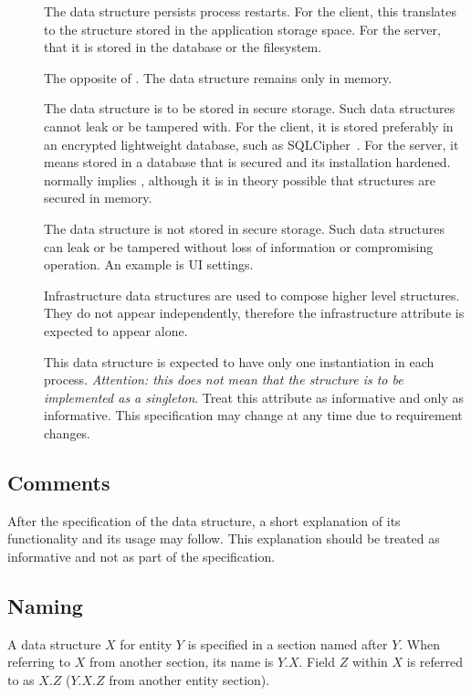 \documentclass[a4paper,10pt]{article}
\begin{document}
\begin{description}
 \item[\persistent] The data structure persists process restarts. For the client, this translates to the structure stored in the application storage space. For the server, that it 
is stored in the database or the filesystem.
 \item[\ephemeral] The opposite of \persistent. The data structure remains only in memory.
 \item[\secure] The data structure is to be stored in secure storage. Such data structures cannot leak or be tampered with. For the client, it is stored preferably in an encrypted 
lightweight database, such as SQLCipher~\cite{sql_cipher}. For the server, it means stored in a database that is secured and its installation hardened. \secure{} normally implies 
\persistent, although it is in theory possible that \ephemeral{} structures are secured in memory.
 \item[\unsecure] The data structure is not stored in secure storage. Such data structures can leak or be tampered without loss of information or compromising operation. An example 
is UI settings.
 \item[\infrastructure] Infrastructure data structures are used to compose higher level structures. They do not appear independently, therefore the infrastructure attribute is 
expected to appear alone.
 \item[\unique] This data structure is expected to have only one instantiation in each process. {\em Attention: this does not mean that the structure is to be implemented as a 
singleton}. Treat this attribute as informative and only as informative. This specification may change at any time due to requirement changes.
\end{description}

\subsection{Comments}
After the specification of the data structure, a short explanation of its functionality and its usage may follow. This explanation should be treated as informative and not as part 
of the specification.

\subsection{Naming}
A data structure $X$ for entity $Y$ is specified in a section named after $Y$. When referring to $X$ from another section, its name is $Y.X$. Field $Z$ within $X$ is referred to 
as $X.Z$ ($Y.X.Z$ from another entity section).
\end{document}
